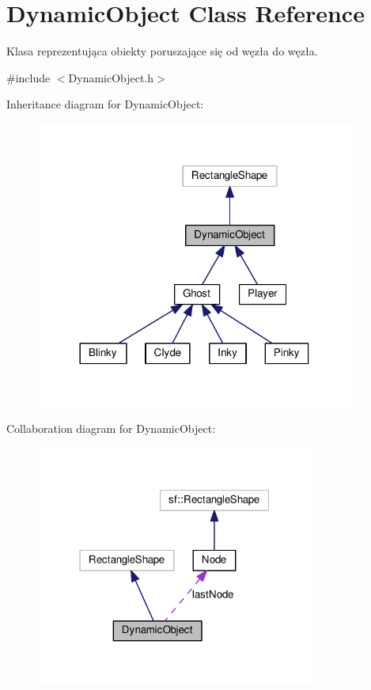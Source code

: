 \hypertarget{classDynamicObject}{}\section{Dynamic\+Object Class Reference}
\label{classDynamicObject}


Klasa reprezentująca obiekty poruszające się od węzła do węzła.  




{\ttfamily \#include $<$Dynamic\+Object.\+h$>$}



Inheritance diagram for Dynamic\+Object\+:\nopagebreak
\begin{figure}[H]
\begin{center}
\leavevmode
\includegraphics[width=297pt]{classDynamicObject__inherit__graph}
\end{center}
\end{figure}


Collaboration diagram for Dynamic\+Object\+:\nopagebreak
\begin{figure}[H]
\begin{center}
\leavevmode
\includegraphics[width=259pt]{classDynamicObject__coll__graph}
\end{center}
\end{figure}
